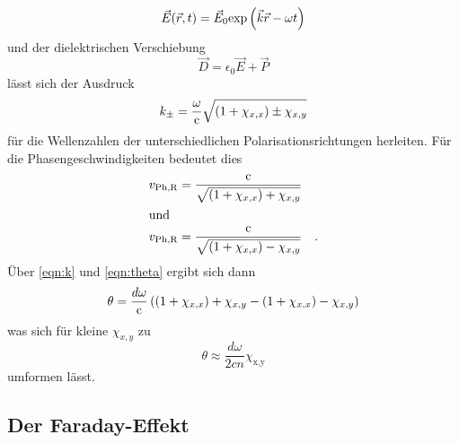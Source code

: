 \begin{equation*}
    \vec{E}(\vec{r},t) = \vec{E}_0 \text{exp}\left(\vec k \vec r - \omega t\right)
\end{equation*}
und der dielektrischen Verschiebung
\begin{equation*}
    \vec D = \epsilon_0 \vec E + \vec P 
\end{equation*}
lässt sich der Ausdruck 
\begin{equation}
    k_\pm = \frac{\omega}{\text{c}} \sqrt{ \left(1 + \chi_{x,x}\right) \pm \chi_{x,y}}
    \label{eqn:k}
\end{equation}
für die Wellenzahlen der unterschiedlichen Polarisationsrichtungen herleiten.
Für die Phasengeschwindigkeiten bedeutet dies 
\begin{align*}
    v_{\text{Ph,R}} &= \frac{\text{c}}{\sqrt{ \left(1 + \chi_{x,x}\right) + \chi_{x,y}}}\\
    \intertext{und}
    v_{\text{Ph,R}} &= \frac{\text{c}}{\sqrt{ \left(1 + \chi_{x,x}\right) - \chi_{x,y}}} \quad .
\end{align*}
Über \autoref{eqn:k} und \autoref{eqn:theta} ergibt sich dann
\begin{equation*}
    \theta = \frac{d \omega}{\text{c}} \left(\left(1 + \chi_{x,x}\right) + \chi_{x,y} - \left(1 + \chi_{x,x}\right) - \chi_{x,y} \right)
\end{equation*}
was sich für kleine $\chi_{x,y}$ zu
\begin{equation*}
    \theta \approx \frac{d\omega}{2cn}\chi_\text{x,y}
\end{equation*}
umformen lässt.


\subsection{Der Faraday-Effekt}
  




